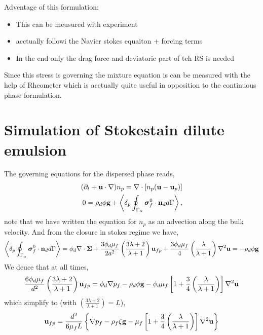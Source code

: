Adventage of this formulation: 
\begin{itemize}
    \item This can be meusured with experiment
    \item acctually followi the Navier stokes equaiton + forcing terms 
    \item In the end only the drag force and deviatoric part of teh RS is needed 
\end{itemize}
Since this stress is governing the mixture equation is can be measured with the help of Rheometer which is acctually quite useful in opposition to the continuous phase formulation. 

\section{Simulation of Stokestain  dilute emulsion}

The governing equations for the dispersed phase reads,
\begin{align}
    (\partial_t + \textbf{u} \cdot \mathbf{\nabla})n_p = \mathbf{\nabla}\cdot[n_p(\textbf{u} - \textbf{u}_p)]\\
    0 
    = 
    \rho_d \phi \textbf{g}
    + \left<\delta_p \oint_{\Gamma_{\alpha}} {\bm{\sigma}_f^0 \cdot \textbf{n}_d} d\Gamma\right>,
\end{align}
note that we have written the equation for $n_p$ as an advection along the bulk velocity. 
And from the closure in stokes regime we have, 
\begin{equation*}
    \left<\delta_p \oint_{\Gamma_{\alpha}} \bm{\sigma}_f^0\cdot \textbf{n}_d d\Gamma\right> = 
    \phi_d \mathbf{\nabla}\cdot\bm\Sigma
    + \frac{3\phi_d\mu_f}{2 a^2} 
    \left(\frac{3\lambda+2}{\lambda+1}\right) \textbf{u}_{f p} 
    + \frac{3\phi_d\mu_f}{4} \left(\frac{\lambda}{\lambda+1}\right)\mathbf{\nabla}^2\textbf{u}
    = - 
    \rho_d \phi \textbf{g}
\end{equation*}
We deuce that at all times, 
\begin{align*}
    \frac{6\phi_d\mu_f}{d^2} 
    \left(\frac{3\lambda+2}{\lambda+1}\right) \textbf{u}_{f p} 
    = 
    \phi_d \mathbf{\nabla} p_f
    - \rho_d \phi \textbf{g}
    - \phi_d \mu_f \left[
        1 + \frac{3}{4} \left(\frac{\lambda}{\lambda+1}\right)
    \right]\mathbf{\nabla}^2 \textbf{u}
\end{align*}
which simplify to (with $\left(\frac{3\lambda+2}{\lambda+1}\right) = L$), 
\begin{align*}
   \textbf{u}_{f p} 
    = 
    \frac{d^2}{6\mu_f L }
    \left\{
        \mathbf{\nabla} p_f
        - \rho_f\zeta   \textbf{g}
        -  \mu_f \left[
            1 + \frac{3}{4} \left(\frac{\lambda}{\lambda+1}\right)
            \right]\mathbf{\nabla}^2 \textbf{u}
    \right\}
\end{align*}


